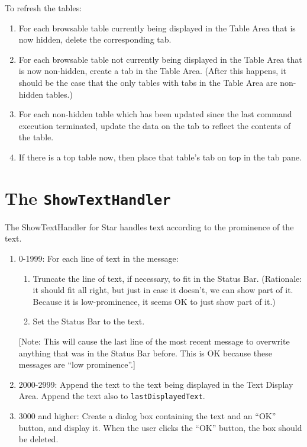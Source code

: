 \documentclass[11pt]{article}
\begin{document}
To refresh the tables:
\begin{enumerate}
\item For each browsable table currently being displayed in the Table Area
  that is now hidden, delete the corresponding tab.
\item For each browsable table not currently being displayed in the Table
  Area that is now non-hidden, create a tab in the Table Area.
  (After this happens, it should be the case that the only tables
  with tabs in the Table Area are non-hidden tables.)
\item For each non-hidden table which has been updated since the
  last command execution terminated, update the data on the tab
  to reflect the contents of the table.
\item If there is a top table now, then place that table's tab on top
  in the tab pane.
\end{enumerate}

\section{The {\tt ShowTextHandler}}

The ShowTextHandler for Star handles text according to the prominence of
the text.
\begin{enumerate}
\item 0-1999:  For each line of text in the message:
  \begin{enumerate}
  \item Truncate the line of text, if necessary, to fit in the Status Bar.
    (Rationale:  it should fit all right, but just in case it doesn't, we
    can show part of it.  Because it is low-prominence, it seems OK to
    just show part of it.)
  \item Set the Status Bar to the text.
  \end{enumerate}
  [Note: This will cause the last line of the most recent message to
  overwrite anything that was in the Status Bar before.  This is OK
  because these messages are ``low prominence''.]
\item 2000-2999:  Append the text to the text being displayed in the
  Text Display Area.  Append the text also to {\tt lastDisplayedText}.
\item 3000 and higher:  Create a dialog box containing the text and an
  ``OK'' button, and display it.  When the user clicks the ``OK'' button,
  the box should be deleted.
\end{enumerate}
\end{document}
